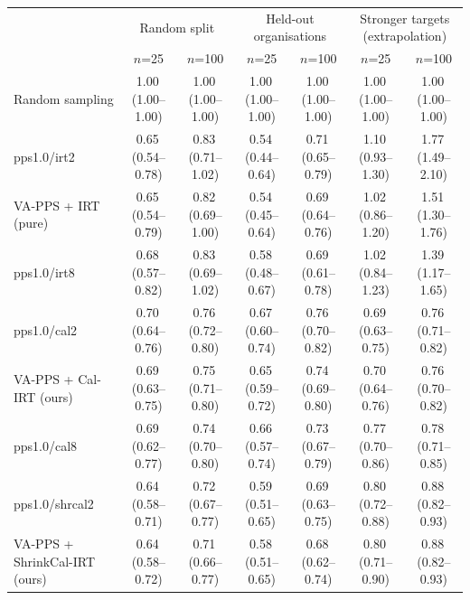 \begin{tabular}{lcccccc}
\toprule
 & \multicolumn{2}{c}{Random split} & \multicolumn{2}{c}{Held-out organisations} & \multicolumn{2}{c}{Stronger targets (extrapolation)} \\
 & $n$=25 & $n$=100 & $n$=25 & $n$=100 & $n$=25 & $n$=100 \\
\midrule
Random sampling & 1.00\,\scriptsize(1.00--1.00) & 1.00\,\scriptsize(1.00--1.00) & 1.00\,\scriptsize(1.00--1.00) & 1.00\,\scriptsize(1.00--1.00) & 1.00\,\scriptsize(1.00--1.00) & 1.00\,\scriptsize(1.00--1.00) \\
pps1.0/irt2 & 0.65\,\scriptsize(0.54--0.78) & 0.83\,\scriptsize(0.71--1.02) & 0.54\,\scriptsize(0.44--0.64) & 0.71\,\scriptsize(0.65--0.79) & 1.10\,\scriptsize(0.93--1.30) & 1.77\,\scriptsize(1.49--2.10) \\
VA-PPS + IRT (pure) & 0.65\,\scriptsize(0.54--0.79) & 0.82\,\scriptsize(0.69--1.00) & 0.54\,\scriptsize(0.45--0.64) & 0.69\,\scriptsize(0.64--0.76) & 1.02\,\scriptsize(0.86--1.20) & 1.51\,\scriptsize(1.30--1.76) \\
pps1.0/irt8 & 0.68\,\scriptsize(0.57--0.82) & 0.83\,\scriptsize(0.69--1.02) & 0.58\,\scriptsize(0.48--0.67) & 0.69\,\scriptsize(0.61--0.78) & 1.02\,\scriptsize(0.84--1.23) & 1.39\,\scriptsize(1.17--1.65) \\
pps1.0/cal2 & 0.70\,\scriptsize(0.64--0.76) & 0.76\,\scriptsize(0.72--0.80) & 0.67\,\scriptsize(0.60--0.74) & 0.76\,\scriptsize(0.70--0.82) & 0.69\,\scriptsize(0.63--0.75) & 0.76\,\scriptsize(0.71--0.82) \\
VA-PPS + Cal-IRT (ours) & 0.69\,\scriptsize(0.63--0.75) & 0.75\,\scriptsize(0.71--0.80) & 0.65\,\scriptsize(0.59--0.72) & 0.74\,\scriptsize(0.69--0.80) & 0.70\,\scriptsize(0.64--0.76) & 0.76\,\scriptsize(0.70--0.82) \\
pps1.0/cal8 & 0.69\,\scriptsize(0.62--0.77) & 0.74\,\scriptsize(0.70--0.80) & 0.66\,\scriptsize(0.57--0.74) & 0.73\,\scriptsize(0.67--0.79) & 0.77\,\scriptsize(0.70--0.86) & 0.78\,\scriptsize(0.71--0.85) \\
pps1.0/shrcal2 & 0.64\,\scriptsize(0.58--0.71) & 0.72\,\scriptsize(0.67--0.77) & 0.59\,\scriptsize(0.51--0.65) & 0.69\,\scriptsize(0.63--0.75) & 0.80\,\scriptsize(0.72--0.88) & 0.88\,\scriptsize(0.82--0.93) \\
VA-PPS + ShrinkCal-IRT (ours) & 0.64\,\scriptsize(0.58--0.72) & 0.71\,\scriptsize(0.66--0.77) & 0.58\,\scriptsize(0.51--0.65) & 0.68\,\scriptsize(0.62--0.74) & 0.80\,\scriptsize(0.71--0.90) & 0.88\,\scriptsize(0.82--0.93) \\

\end{tabular}
